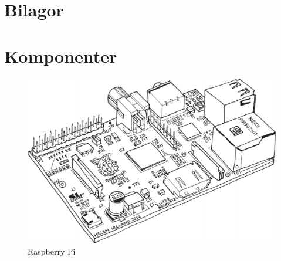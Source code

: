\documentclass{article}
\begin{document}
    \newpage

    \clearpage
    \printbibliography      
    \newpage
    \section{Bilagor} %
    \label{sec:appendix}
    \appendix
        \section{Komponenter} %
        \label{sec:komp}
                \begin{figure}[h!]
                  \centering
                    \includegraphics[scale=0.4]{img/rpi}
                  \caption{Raspberry Pi}
                  \label{fig:raspberry}
                \end{figure}
\end{document}
